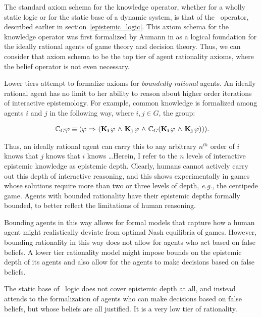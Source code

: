 The standard axiom schema for the knowledge operator, whether for a wholly static logic or for the static base of a dynamic system, is that of the \SFive\ operator, described earlier in section~\ref{epistemic_logic}. This axiom schema for the knowledge operator was first formalized by Aumann in \cite{Aumann} as a logical foundation for the ideally rational agents of game theory and decision theory. Thus, we can consider that axiom schema to be the top tier of agent rationality axioms, where the belief operator is not even necessary.

Lower tiers attempt to formalize axioms for \emph{boundedly rational} agents. An ideally rational agent has no limit to her ability to reason about higher order iterations of interactive epistemology. For example, common knowledge is formalized among agents $i$ and $j$ in the following way, where $i,j\in G$, the group:

\begin{eqnarray}~\label{common_knowledge}
	\mathbb{C}_{G}\varphi \equiv (\varphi {\ \Rightarrow \ } (\mathbf{K}_{\mathbf{i}}\,\varphi {\ \wedge \ } \mathbf{K}_{\mathbf{j}}\,\varphi {\ \wedge \ } \mathbb{C}_{G}(\mathbf{K}_{\mathbf{i}}\,\varphi {\ \wedge \ } \mathbf{K}_{\mathbf{j}}\,\varphi))).
\end{eqnarray}

Thus, an ideally rational agent can carry this to any arbitrary $\mathit{n^{th}}$ order of $i$ knows that $j$ knows that $i$ knows \dots Herein, I refer to the $n$ levels of interactive epistemic knowledge as epistemic depth. Clearly, humans cannot actively carry out this depth of interactive reasoning, and this shows experimentally in games whose solutions require more than two or three levels of depth, \emph{e.g.,} the centipede game. Agents with bounded rationality have their epistemic depths formally bounded, to better reflect the limitations of human reasoning.

Bounding agents in this way allows for formal models that capture how a human agent might realistically deviate from optimal Nash equilibria of games. However, bounding rationality in this way does not allow for agents who act based on false beliefs. A lower tier rationality model might impose bounds on the epistemic depth of its agents and also allow for the agents to make decisions based on false beliefs.

The static base of \DASL\ logic does not cover epistemic depth at all, and instead attends to the formalization of agents who can make decisions based on false beliefs, but whose beliefs are all justified. It is a very low tier of rationality.

